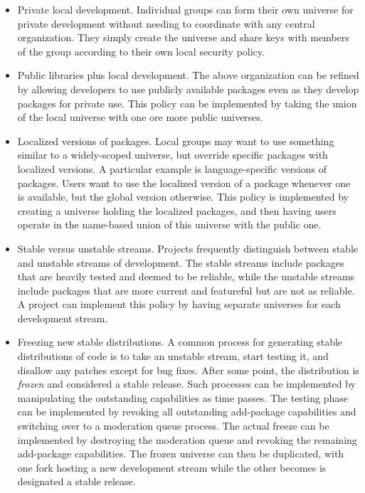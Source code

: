 \documentclass{article}
\begin{document}
\begin{itemize}
\item Private local development.  Individual groups can form their own
      universe for private development without needing to coordinate
      with any central organization.  They simply create the universe
      and share keys with members of the group according to their
      own local security policy.

\item Public libraries plus local development.  The above organization
      can be refined by allowing developers to use publicly
      available packages even as they develop packages for private
      use.  This policy can be implemented by taking the union of the
      local universe with one ore more public universes.


\item Localized versions of packages.  Local groups may want to use
      something similar to a widely-scoped universe, but override
      specific packages with localized versions.  A particular example
      is language-specific versions of packages.  Users want to use
      the localized version of a package whenever one is available,
      but the global version otherwise.  This policy is implemented by
      creating a universe holding the localized packages, and then
      having users operate in the name-based union of this universe
      with the public one.

\item Stable versus unstable streams.  Projects frequently distinguish
      between stable and unstable streams of development.  The stable
      streams include packages that are heavily tested and deemed to
      be reliable, while the unstable streams include packages that
      are more current and featureful but are not as reliable.  A
      project can implement this policy by having separate universes
      for each development stream.  

\item Freezing new stable distributions.  A common process for
      generating stable distributions of code is to take an unstable
      stream, start testing it, and disallow any patches except for
      bug fixes.
      After some
      point, the distribution is \emph{frozen} and considered a stable
      release.  Such processes can be implemented by manipulating the
      outstanding capabilities as time passes.  The testing phase can
      be implemented by revoking all outstanding add-package
      capabilities and switching over to a moderation queue process.  The
      actual freeze can be implemented by destroying the moderation
      queue and revoking the remaining add-package capabilities.  The
      frozen universe can then be duplicated, with one fork hosting
      a new development stream while the other becomes is designated
      a stable release.
\end{itemize}
\end{document}
